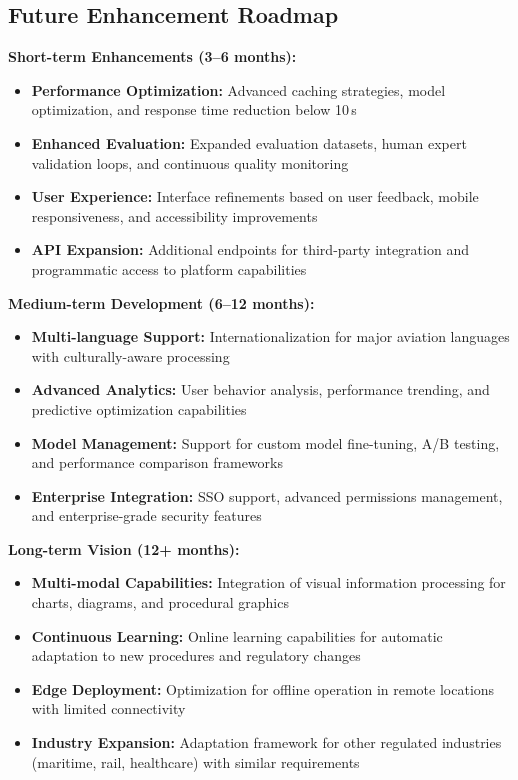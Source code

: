 \subsection{Future Enhancement Roadmap}
\label{subsec:future_roadmap_s3}

\textbf{Short-term Enhancements (3--6 months):}
\begin{itemize}
    \item \textbf{Performance Optimization:} Advanced caching strategies, model optimization, and response time reduction below 10\,s
    \item \textbf{Enhanced Evaluation:} Expanded evaluation datasets, human expert validation loops, and continuous quality monitoring
    \item \textbf{User Experience:} Interface refinements based on user feedback, mobile responsiveness, and accessibility improvements
    \item \textbf{API Expansion:} Additional endpoints for third-party integration and programmatic access to platform capabilities
\end{itemize}

\textbf{Medium-term Development (6--12 months):}
\begin{itemize}
    \item \textbf{Multi-language Support:} Internationalization for major aviation languages with culturally-aware processing
    \item \textbf{Advanced Analytics:} User behavior analysis, performance trending, and predictive optimization capabilities
    \item \textbf{Model Management:} Support for custom model fine-tuning, A/B testing, and performance comparison frameworks
    \item \textbf{Enterprise Integration:} SSO support, advanced permissions management, and enterprise-grade security features
\end{itemize}

\textbf{Long-term Vision (12+ months):}
\begin{itemize}
    \item \textbf{Multi-modal Capabilities:} Integration of visual information processing for charts, diagrams, and procedural graphics
    \item \textbf{Continuous Learning:} Online learning capabilities for automatic adaptation to new procedures and regulatory changes
    \item \textbf{Edge Deployment:} Optimization for offline operation in remote locations with limited connectivity
    \item \textbf{Industry Expansion:} Adaptation framework for other regulated industries (maritime, rail, healthcare) with similar requirements
\end{itemize}

